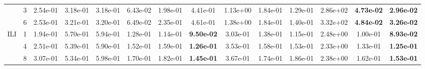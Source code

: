 \begin{table}[h]
{\begin{tabular}{cccccccccccccc}
                                     & 3                  & 2.54e-01                        & 3.18e-01                     & 3.18e-01                   & 6.43e-02                     & 1.98e-01          & 4.41e-01          & 1.13e+00 & 1.84e-01 & 1.29e-01          & 2.86e+02 & \bf{4.73e-02} & \bf{2.96e-02}\s \\\cmidrule(l){3-14}
                                     & 6                  & 2.53e-01                        & 3.21e-01                     & 3.20e-01                   & 6.49e-02                     & 2.35e-01          & 4.61e-01          & 1.38e+00 & 1.84e-01 & 1.40e-01          & 3.32e+02 & \bf{4.84e-02} & \bf{3.26e-02}\s \\\cmidrule(l){2-14}
            \multirow{3}{*}{ILI}     & 1                  & 1.94e-01                        & 5.70e-01                     & 5.94e-01                   & 1.28e-01                     & 1.14e-01          & \bf{9.50e-02} & 3.03e-01 & 1.38e-01 & 1.15e-01          & 2.48e+00 & 1.00e-01          & \bf{8.93e-02}\s \\\cmidrule(l){3-14}
                                     & 4                  & 2.51e-01                        & 5.39e-01                     & 5.90e-01                   & 1.52e-01                     & 1.59e-01          & \bf{1.26e-01} & 3.53e-01 & 1.58e-01 & 1.53e-01          & 2.33e+00 & 1.33e-01          & \bf{1.25e-01}\s \\\cmidrule(l){3-14}
                                     & 8                  & 3.07e-01                        & 5.34e-01                     & 5.98e-01                   & 1.70e-01                     & 1.82e-01          & \bf{1.45e-01}\s & 3.67e-01 & 1.74e-01 & 1.86e-01          & 2.38e+00 & 1.62e-01          & \bf{1.53e-01} \\
            \bottomrule
        \end{tabular}}
\end{table}

